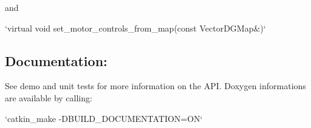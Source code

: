 and \begin{DoxyVerb}`virtual void set_motor_controls_from_map(const VectorDGMap&)`
\end{DoxyVerb}


\subsection*{Documentation\+:}

See demo and unit tests for more information on the A\+PI. Doxygen informations are available by calling\+: \begin{DoxyVerb}`catkin_make -DBUILD_DOCUMENTATION=ON`\end{DoxyVerb}
 